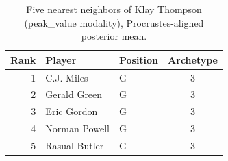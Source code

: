 \begin{table}[htbp]
  \centering\small
  \begin{tabular}{rllc}
    \toprule
    Rank & Player & Position & Archetype \\
    \midrule
    1 & C.J. Miles & G & 3 \\
    2 & Gerald Green & G & 3 \\
    3 & Eric Gordon & G & 3 \\
    4 & Norman Powell & G & 3 \\
    5 & Rasual Butler & G & 3 \\
    \bottomrule
  \end{tabular}
  \caption{Five nearest neighbors of Klay Thompson (peak_value modality), Procrustes-aligned posterior mean.}
  \label{tab:Klay_Thompson_neighbors_peak_value}
\end{table}

